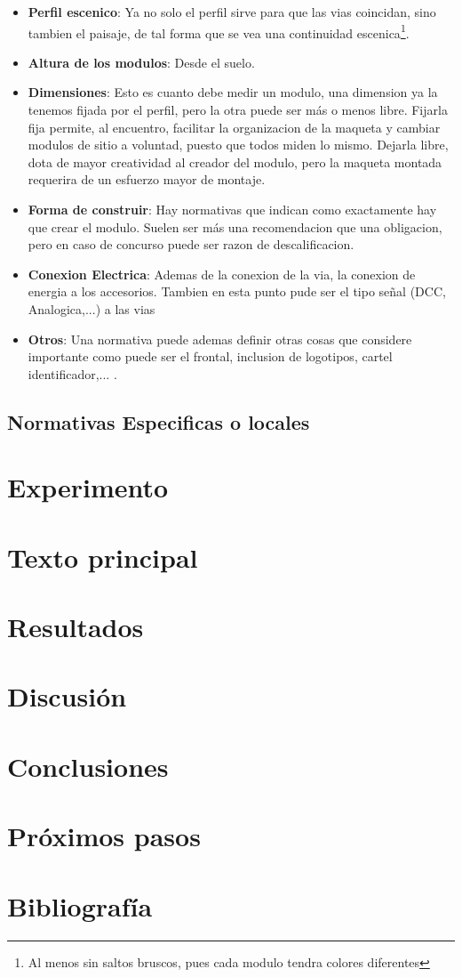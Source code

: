 \begin{itemize}
	\item \textbf{Perfil escenico}: Ya no solo el perfil sirve para que las vias coincidan, sino tambien el paisaje, de tal forma que se vea una continuidad escenica\footnote{Al menos sin saltos bruscos, pues cada modulo tendra colores diferentes}.
	\item \textbf{Altura de los modulos}: Desde el suelo.
	\item \textbf{Dimensiones}: Esto es cuanto debe medir un modulo, una dimension ya la tenemos fijada por el perfil, pero la otra puede ser más o menos libre. Fijarla fija permite, al encuentro, facilitar la organizacion de la maqueta y cambiar modulos de sitio a voluntad, puesto que todos miden lo mismo. Dejarla libre, dota de mayor creatividad al creador del modulo, pero la maqueta montada requerira de un esfuerzo mayor de montaje.
	\item \textbf{Forma de construir}: Hay normativas que indican como exactamente hay que crear el modulo. Suelen ser más una recomendacion que una obligacion, pero en caso de concurso puede ser razon de descalificacion. 
	\item \textbf{Conexion Electrica}: Ademas de la conexion de la via, la conexion de energia a los accesorios. Tambien en esta punto pude ser el tipo señal (DCC, Analogica,...) a las vias
	\item \textbf{Otros}: Una normativa puede ademas definir otras cosas que considere importante como puede ser el frontal, inclusion de logotipos, cartel identificador,... .

\end{itemize}

  
\subsection{Normativas Especificas o locales}

\section{Experimento}
\section{Texto principal}
\section{Resultados} 
\section{Discusión}
\section{Conclusiones}
\section{Próximos pasos}

\section{Bibliografía}
\printbibliography[heading=subbibliography]
